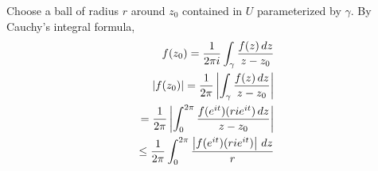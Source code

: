 \documentclass{homework}
\begin{document}
                                                                                                                                                                                                                                                                                                            \begin{solution}
                                                                                                                                                                                                                                                                                                            Choose a ball of radius $r$ around $z_0$ contained in $U$ parameterized by $\gamma$. By Cauchy's integral formula,
                                                                                                                                                                                                                                                                                                            \begin{align*}
                                                                                                                                                                                                                                                                                                            f(z_0) = \frac{1}{2\pi i}\int_{\gamma} \frac{f(z) \, dz}{z - z_0}\\
                                                                                                                                                                                                                                                                                                            \abs{f(z_0)} = \frac{1}{2\pi}\abs{\int_{\gamma} \frac{f(z) \, dz}{z-z_0}}\\
                                                                                                                                                                                                                                                                                                            = \frac{1}{2\pi}\abs{\int_0^{2\pi} \frac{f(e^{it})(rie^{it}) \, dz}{z - z_0}}\\
                                                                                                                                                                                                                                                                                                            \leq \frac{1}{2\pi}\int_0^{2\pi} \frac{\abs{f(e^{it})(rie^{it})} \, dz}{r}\\

\end{align*}
\end{solution}
\end{document}
